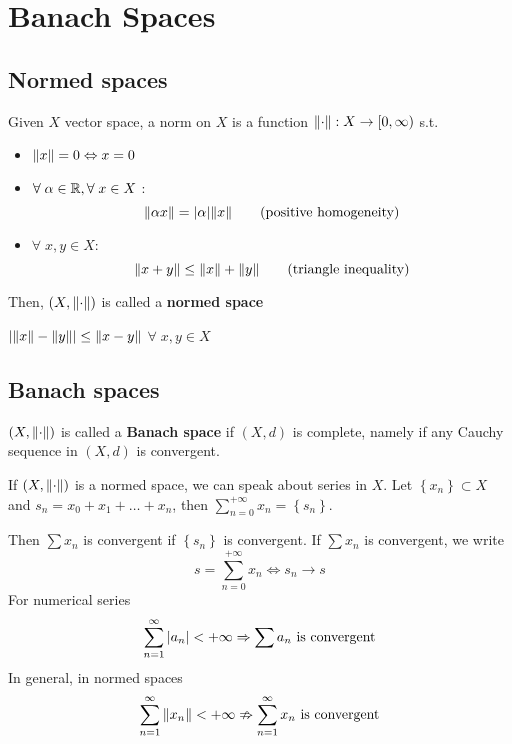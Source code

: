 \newpage
\section{Banach Spaces}
\subsection{Normed spaces}
\begin{definition}
    Given \(X\) vector space, a norm on \(X\) is a function \(\norm{\cdot} : X \to [0, \infty)\) s.t.
    \begin{itemize}
        \item \(\norm{x} = 0 \Leftrightarrow x = 0\)
        \item \(\forall \; \alpha \in \mathbb{R}, \forall \; x \in X\) : 
        \[
            \norm{\alpha x} = \abs{\alpha}\norm{x}  \tag*{(positive homogeneity)}
        \]
        \item \(\forall \; x,y \in X\): 
        \[
            \norm{x+y} \leq \norm{x} + \norm{y} \tag*{(triangle inequality)}
        \]
    \end{itemize}
    Then, \((X, \norm{\cdot})\) is called a \textbf{normed space}
\end{definition}
\begin{example}
    \(\abs{\norm{x} - \norm{y}} \leq \norm{x - y}\) \(\forall \; x,y \in X\)
    
\end{example}
\subsection{Banach spaces}
\begin{definition}
    \((X, \norm{\cdot})\) is called a \textbf{Banach space} if \((X, d)\) is complete, namely if any Cauchy sequence in \((X, d)\) is convergent.
\end{definition}
If \((X, \norm{\cdot})\) is a normed space, we can speak about series in \(X\). Let \(\left\{ x_n \right\} \subset X\) and \(s_n = x_0 + x_1 + \ldots + x_n\), then \(\sum_{n=0}^{+\infty} x_n = \left\{ s_n \right\}\). 

Then \(\sum x_n\) is convergent if \(\left\{ s_n \right\}\) is convergent. If \(\sum x_n\) is convergent, we write 
\[
    s = \sum_{n = 0}^{+\infty} x_n \Leftrightarrow s_n \to s
\]
For numerical series
\[
    \sum_{n=1}^{\infty} \abs{a_n} < +\infty \Rightarrow \sum a_n \mbox{ is convergent}
\]
In general, in normed spaces 
\[
    \sum_{n=1}^{\infty} \norm{x_n} < +\infty \nRightarrow \sum_{n=1}^{\infty} x_n \mbox{ is convergent}
\]
